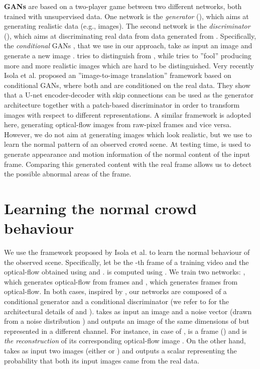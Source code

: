 \documentclass{article}
\begin{document}
	
	\noindent
	{\bf GANs} \cite{DBLP:conf/nips/GoodfellowPMXWOCB14,DBLP:conf/nips/SalimansGZCRCC16,DBLP:journals/corr/RadfordMC15} are based on a two-player game between two different networks, both trained with unsupervised data. One network is the {\em generator} (), which aims at generating realistic data (e.g., images). The second network is the {\em discriminator} (), which aims at discriminating real data from data generated from . 
	Specifically, the {\em conditional} GANs \cite{DBLP:conf/nips/GoodfellowPMXWOCB14}, that we use in our approach,
	take as input an image  and generate a new image . 
	 tries to distinguish  from , while  tries to ''fool''  producing more and more realistic images which are hard to be distinguished.
	Very recently Isola et al. \cite{DBLP:journals/corr/IsolaZZE16} proposed an ''image-to-image translation'' framework based on conditional GANs, where both  and  are conditioned on the real data. They show that a U-net encoder-decoder with skip connections can be used as the generator architecture together with a patch-based discriminator in order to transform images with respect to different representations.
	A similar framework is adopted here, generating optical-flow images from raw-pixel frames and vice versa. However, we do not aim at generating images which look realistic, but we use  to learn the normal pattern of an observed crowd scene. At testing time,  is used to generate appearance and motion information of the normal content of the input frame.
	Comparing this generated content with the real frame allows us to detect the possible abnormal areas of the frame.
	
\section{Learning the normal crowd behaviour}
	\label{sec:learing}
	
	We use the framework proposed by Isola et al. \cite{DBLP:journals/corr/IsolaZZE16} to learn the normal behaviour of the observed scene. Specifically, let  be the -th frame of a training video and  the optical-flow obtained using  and .  is computed using \cite{brox2004high}.
	We train two networks: , which generates optical-flow from frames and 
	, which generates frames from optical-flow.
	In both cases, inspired by \cite{DBLP:journals/corr/IsolaZZE16}, our networks are composed of a conditional generator 
	and a conditional discriminator  (we refer to \cite{DBLP:journals/corr/IsolaZZE16} for the architectural details of  and ).  takes as input an image  and a noise vector  (drawn from a noise distribution ) and outputs an image  of the same dimensions 
	of  
	but represented in a different channel. For instance, in case of ,  is a frame () and  is {\em the reconstruction} of its corresponding optical-flow image . On the other hand,
	 takes as input two images (either  or ) and outputs a scalar representing the probability that both its input images came from the real data.
	
\end{document}
